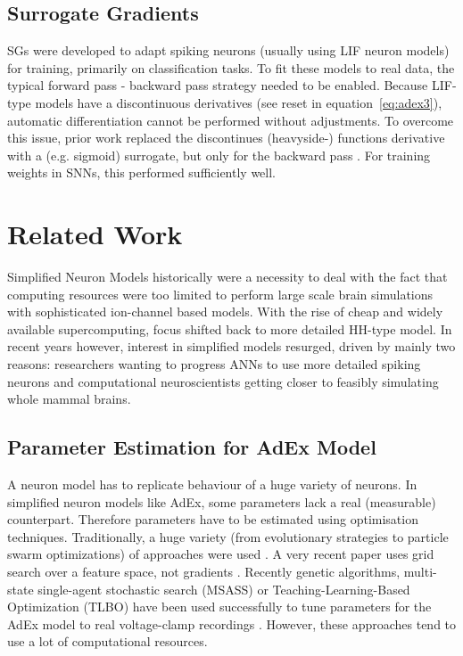 \documentclass[conference]{IEEEtran}
\begin{document}
\subsection{Surrogate Gradients}
\acfp{SG} were developed to adapt spiking neurons (usually using \ac{LIF} neuron models) for training, primarily on classification tasks.
To fit these models to real data, the typical forward pass - backward pass strategy needed to be enabled.
Because \ac{LIF}-type models have a discontinuous derivatives (see reset in equation~\ref{eq:adex3}), automatic differentiation cannot be performed without adjustments.
To overcome this issue, prior work replaced the discontinues (heavyside-) functions derivative with a (e.g. sigmoid) surrogate, but only for the backward pass \cite{Neftci2019}.
For training weights in \acp{SNN}, this performed sufficiently well.

\section{Related Work}\label{sec:relwork}
Simplified Neuron Models historically were a necessity to deal with the fact that computing resources were too limited to perform large scale brain simulations with sophisticated ion-channel based models.
With the rise of cheap and widely available supercomputing, focus shifted back to more detailed \ac{HH}-type model.
In recent years however, interest in simplified models resurged, driven by mainly two reasons: researchers wanting to progress \acp{ANN} to use more detailed spiking neurons and computational neuroscientists getting closer to feasibly simulating whole mammal brains.
\subsection{Parameter Estimation for AdEx Model}
A neuron model has to replicate behaviour of a huge variety of neurons.
In simplified neuron models like \ac{AdEx}, some parameters lack a real (measurable) counterpart.
Therefore parameters have to be estimated using optimisation techniques.
Traditionally, a huge variety (from evolutionary strategies to particle swarm optimizations) of approaches were used \cite{VanGeit2008}.
A very recent paper uses grid search over a feature space, not gradients \cite{Guarino2025}.
Recently genetic algorithms, multi-state single-agent stochastic search (MSASS) or Teaching-Learning-Based Optimization (TLBO) have been used successfully to tune parameters for the \ac{AdEx} model to real voltage-clamp recordings \cite{Marin2020, Cruz2021}.
However, these approaches tend to use a lot of computational resources.
\end{document}
